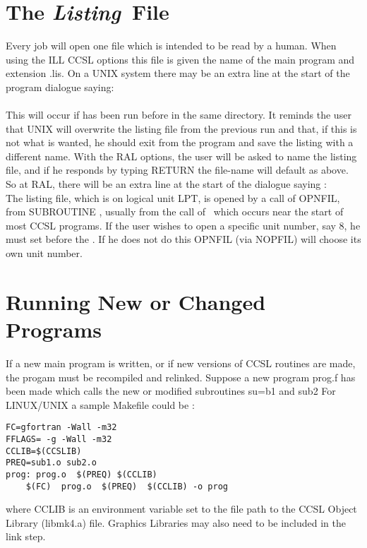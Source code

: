 \section{The \emph{Listing}\ File}
Every job will open one file which is intended to be read by a human.
When using the ILL CCSL options this file is given the name of the 
main program and extension .lis. On a UNIX system there may
be an extra line at the start of the program dialogue saying:\\
\\
This will occur if  has been run before in the same directory. 
It reminds the user that UNIX will overwrite the listing file from 
the previous run and that, if this is not what is wanted, he should exit 
from the program and save the listing with a different name. 
With the RAL options, the user will 
be asked to name the listing file, and if he responds by typing RETURN the file-name 
will default as above.  So at RAL, there will be an extra line at the start of
the dialogue saying :\\
\p
The listing file, which is on logical unit LPT,
is opened by a call of OPNFIL, from SUBROUTINE , usually from
the call of \ which occurs near the start of most CCSL programs.  If
the user wishes to open a specific unit number, say 8, he must set
 before the .
\pn
If he does not do this OPNFIL (via NOPFIL) will choose its own unit number.
%
\section{Running New or Changed Programs}
If a new main program is written, or if new versions of CCSL routines
are made, the progam must be recompiled and relinked.
Suppose a new program prog.f has been made which calls the new or modified
subroutines su=b1 and sub2
For LINUX/UNIX a sample  Makefile could be :\pn
\begin{verbatim} 
FC=gfortran -Wall -m32
FFLAGS= -g -Wall -m32
CCLIB=$(CCSLIB)
PREQ=sub1.o sub2.o 
prog: prog.o  $(PREQ) $(CCLIB)
	$(FC)  prog.o  $(PREQ)  $(CCLIB) -o prog
\end{verbatim}
where CCLIB is an environment variable set to the file path to the  CCSL Object Library 
(libmk4.a) file.
\ssk
 Graphics Libraries may also need to be included in the link step.
\pn 
% 
